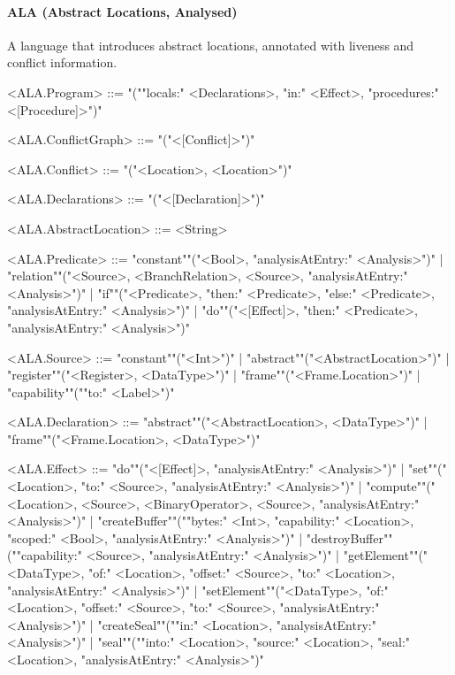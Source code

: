 \documentclass[main.tex]{subfiles}
\begin{document}
\paragraph{ ALA (Abstract Locations, Analysed) } A language that introduces abstract locations, annotated with liveness and conflict information.
\begin{grammar}
	\footnotesize
				<ALA.Program> ::=
							"(""locals:" <Declarations>, "in:" <Effect>, "procedures:" <[Procedure]>")"
				\par
				<ALA.ConflictGraph> ::=
							"("<[Conflict]>")"
				\par
				<ALA.Conflict> ::=
							"("<Location>, <Location>")"
				\par
				<ALA.Declarations> ::=
							"("<[Declaration]>")"
				\par
				<ALA.AbstractLocation> ::=
						<String>
				\par
				<ALA.Predicate> ::=
						"constant""("<Bool>, "analysisAtEntry:" <Analysis>")"
						| "relation""("<Source>, <BranchRelation>, <Source>, "analysisAtEntry:" <Analysis>")"
						| "if""("<Predicate>, "then:" <Predicate>, "else:" <Predicate>, "analysisAtEntry:" <Analysis>")"
						| "do""("<[Effect]>, "then:" <Predicate>, "analysisAtEntry:" <Analysis>")"
				\par
				<ALA.Source> ::=
						"constant""("<Int>")"
						| "abstract""("<AbstractLocation>")"
						| "register""("<Register>, <DataType>")"
						| "frame""("<Frame.Location>")"
						| "capability""(""to:" <Label>")"
				\par
				<ALA.Declaration> ::=
						"abstract""("<AbstractLocation>, <DataType>")"
						| "frame""("<Frame.Location>, <DataType>")"
				\par
				<ALA.Effect> ::=
						"do""("<[Effect]>, "analysisAtEntry:" <Analysis>")"
						| "set""("<Location>, "to:" <Source>, "analysisAtEntry:" <Analysis>")"
						| "compute""("<Location>, <Source>, <BinaryOperator>, <Source>, "analysisAtEntry:" <Analysis>")"
						| "createBuffer""(""bytes:" <Int>, "capability:" <Location>, "scoped:" <Bool>, "analysisAtEntry:" <Analysis>")"
						| "destroyBuffer""(""capability:" <Source>, "analysisAtEntry:" <Analysis>")"
						| "getElement""("<DataType>, "of:" <Location>, "offset:" <Source>, "to:" <Location>, "analysisAtEntry:" <Analysis>")"
						| "setElement""("<DataType>, "of:" <Location>, "offset:" <Source>, "to:" <Source>, "analysisAtEntry:" <Analysis>")"
						| "createSeal""(""in:" <Location>, "analysisAtEntry:" <Analysis>")"
						| "seal""(""into:" <Location>, "source:" <Location>, "seal:" <Location>, "analysisAtEntry:" <Analysis>")"

\end{grammar}
\end{document}
